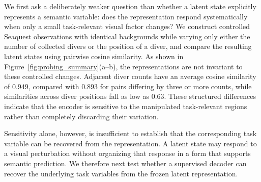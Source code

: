 \documentclass{article} %
\begin{document}
We first ask a deliberately weaker question than whether a latent state explicitly represents a semantic variable: does the representation respond systematically when only a small task-relevant visual factor changes? We construct controlled Seaquest observations with identical backgrounds while varying only either the number of collected divers or the position of a diver, and compare the resulting latent states using pairwise cosine similarity. As shown in Figure~\ref{fig:probing_summary}(a--b), the representations are not invariant to these controlled changes. Adjacent diver counts have an average cosine similarity of $0.949$, compared with $0.893$ for pairs differing by three or more counts, while similarities across diver positions fall as low as $0.63$. These structured differences indicate that the encoder is sensitive to the manipulated task-relevant regions rather than completely discarding their variation.

Sensitivity alone, however, is insufficient to establish that the corresponding task variable can be recovered from the representation. A latent state may respond to a visual perturbation without organizing that response in a form that supports semantic prediction. We therefore next test whether a supervised decoder can recover the underlying task variables from the frozen latent representation.
\end{document}
